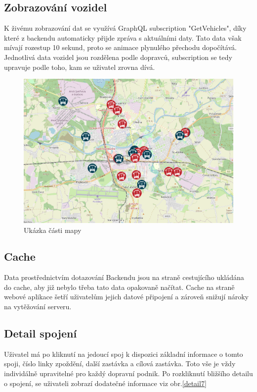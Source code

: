 \subsection{Zobrazování vozidel}
K živému zobrazování dat se využívá GraphQL subscription "GetVehicles", díky které z backendu automaticky přijde zpráva s aktuálními daty. Tato data však mívají rozestup 10 sekund, proto se animace plynulého přechodu dopočítává. Jednotlivá data vozidel jsou rozdělena podle dopravců, subscription se tedy upravuje podle toho, kam se uživatel zrovna dívá.
\begin{figure}[H]
    \centering
    \includegraphics[width=1\textwidth]{images/Screenshot from 2023-03-18 20-15-00.png}
    \caption{Ukázka části mapy}
    \label{mapa}
\end{figure}
\subsection{Cache}
Data prostřednictvím dotazování Backendu jsou na straně cestujícího ukládána do cache, aby již nebylo třeba tato data opakovaně načítat.
Cache na straně webové aplikace šetří uživatelům jejich datové připojení a zároveň snižují nároky na vytěžování serveru.

\subsection{Detail spojení}
Uživatel má po kliknutí na jedoucí spoj k dispozici základní informace o tomto spoji, číslo linky zpoždění, další zastávka a cílová zastávka. Toto vše je vždy individálně upravitelné pro každý dopravní podnik. Po rozkliknutí bližšího detailu o spojení, se uživateli zobrazí dodatečné informace viz obr.\ref{detail7}

